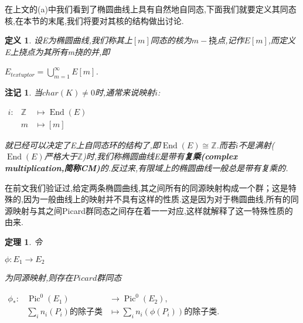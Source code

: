 \documentclass[11pt]{ctexart}
\DeclareMathOperator{\End}{End}
\DeclareMathOperator{\Pic}{Pic}
\newtheorem{thm}{定理}[section]
\newtheorem{defi}{定义}[section]
\newtheorem{rem}{注记}[section]
\begin{document}
在上文的(a)中我们看到了椭圆曲线上具有自然地自同态,下面我们就要定义其同态核,在本节的末尾,我们将要对其核的结构做出讨论.

\begin{defi}设E为椭圆曲线,我们称其上$[m]$同态的核为\textbf{$m-挠$}点,记作$E[m]$,而定义E上挠点为其所有m挠的并,即
    \begin{center}
        $E_{textup{tor}}=\bigcup\limits_{m=1}^{\infty}E[m]$.
    \end{center}




\end{defi}

\begin{rem}当$char(K) \neq 0$时,通常来说映射$i$:

    \begin{center}
        $
        \begin{array}{lcl}
            i:&\mathbb{Z}&\longmapsto \End(E)\\

            &m&\longmapsto [m]
        \end{array}
        $
    \end{center}

就已经可以决定了E上自同态环的结构了,即$\End(E)\cong \mathbb{Z}$.而若$i$不是满射($\End(E)$严格大于$\mathbb{Z}$)时,我们称椭圆曲线E是带有\textbf{复乘(complex multiplication,简称CM)}的.反过来,有限域上的椭圆曲线一般总是带有复乘的.



\end{rem}

在前文我们验证过,给定两条椭圆曲线,其之间所有的同源映射构成一个群；这是特殊的,因为一般曲线上的映射并不具有这样的性质.这是因为对于椭圆曲线,所有的同源映射与其之间Picard群同态之间存在着一一对应,这样就解释了这一特殊性质的由来.

\begin{thm}令
    \begin{center}
        $\phi : E_1 \rightarrow E_2$
    \end{center}
\noindent 为同源映射,则存在$Picard$群同态
\begin{center}
$\begin{array}{lcl}
    \phi_{*} : &\Pic^{0}(E_1) &\rightarrow \Pic^{0}(E_2),\\
    
    &\sum\limits_{i} n_i(P_i)\textrm{的除子类}   &\mapsto \sum\limits_{i} n_i(\phi(P_i))\textrm{的除子类}.
\end{array}$
\end{center}

\end{thm}
\end{document}
